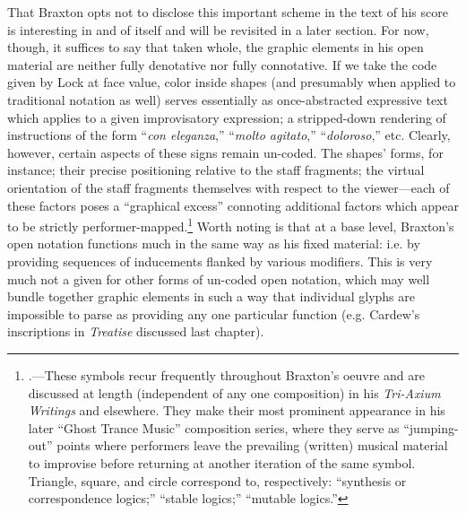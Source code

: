         That Braxton opts not to disclose this important scheme in the text of his score is interesting in and of itself and will be revisited in a later section. For now, though, it suffices to say that taken whole, the graphic elements in his open material are neither fully denotative nor fully connotative. If we take the code given by Lock at face value, color inside shapes (and presumably when applied to traditional notation as well) serves essentially as once-abstracted expressive text which applies to a given improvisatory expression; a stripped-down rendering of instructions of the form ``\textit{con eleganza},'' ``\textit{molto agitato},'' ``\textit{doloroso},'' etc. Clearly, however, certain aspects of these signs remain un-coded. The shapes' forms, for instance; their precise positioning relative to the staff fragments; the virtual orientation of the staff fragments themselves with respect to the viewer---each of these factors poses a ``graphical excess'' connoting additional factors which appear to be strictly performer-mapped.\footnote{\autocite{Dicker_2016}.---These symbols recur frequently throughout Braxton's oeuvre and are discussed at length (independent of any one composition) in his \textit{Tri-Axium Writings} and elsewhere. They make their most prominent appearance in his later ``Ghost Trance Music'' composition series, where they serve as ``jumping-out'' points where performers leave the prevailing (written) musical material to improvise before returning at another iteration of the same symbol. Triangle, square, and circle correspond to, respectively: ``synthesis or correspondence logics;'' ``stable logics;'' ``mutable logics.''} Worth noting is that at a base level, Braxton's open notation functions much in the same way as his fixed material: i.e. by providing sequences of inducements flanked by various modifiers. This is very much not a given for other forms of un-coded open notation, which may well bundle together graphic elements in such a way that individual glyphs are impossible to parse as providing any one particular function (e.g. Cardew's inscriptions in \textit{Treatise} discussed last chapter).


